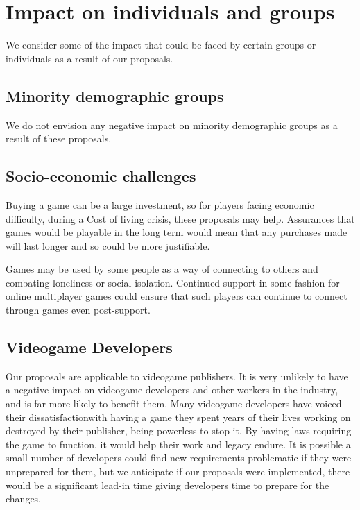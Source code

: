 \section{Impact on individuals and groups}
We consider some of the impact that could be faced by certain groups or individuals as a result of our proposals.

\subsection{Minority demographic groups}
We do not envision any negative impact on minority demographic groups as a result of these proposals.

\subsection{Socio-economic challenges}
Buying a game can be a large investment\cn, so for players facing economic difficulty, during a Cost of living crisis, these proposals may help.
Assurances that games would be playable in the long term would mean that any purchases made will last longer and so could be more justifiable.

Games may be used by some people as a way of connecting to others and combating loneliness or social isolation\cn.
Continued support in some fashion for online multiplayer games could ensure that such players can continue to connect through games even post-support.

\subsection{Videogame Developers}
Our proposals are applicable to videogame publishers.
It is very unlikely to have a negative impact on videogame developers and other workers in the industry, and is far more likely to benefit them.
Many videogame developers have voiced their dissatisfaction\cn with having a game they spent years of their lives working on destroyed by their publisher, being powerless to stop it.
By having laws requiring the game to function, it would help their work and legacy endure.
It is possible a small number of developers could find new requirements problematic if they were unprepared for them,
but we anticipate if our proposals were implemented, there would be a significant lead-in time giving developers time to prepare for the changes.



